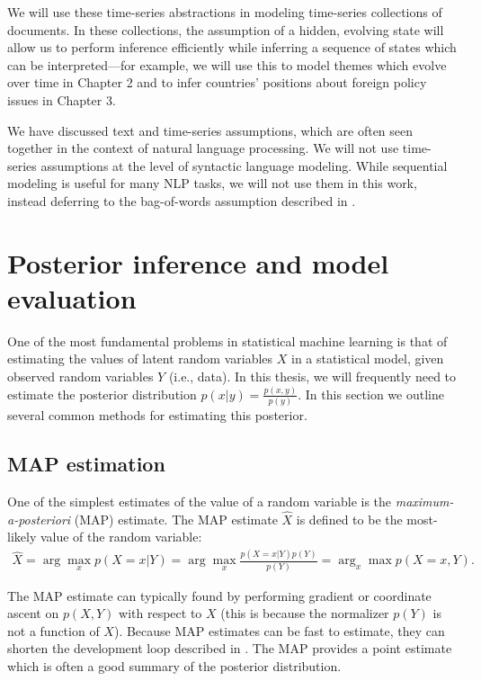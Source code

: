 We will use these time-series abstractions in modeling time-series
collections of documents.  In these collections, the assumption of a
hidden, evolving state will allow us to perform inference efficiently
while inferring a sequence of states which can be interpreted---for
example, we will use this to model themes which evolve over time in
Chapter 2 and to infer countries' positions about foreign policy
issues in Chapter 3.

We have discussed text and time-series assumptions, which are often
seen together in the context of natural language processing.  We will
not use time-series assumptions at the level of syntactic language
modeling.  While sequential modeling is useful for many NLP tasks, we
will not use them in this work, instead deferring to the bag-of-words
assumption described in .


\section{Posterior inference and model evaluation}
One of the most fundamental problems in statistical machine learning
is that of estimating the values of latent random variables $X$ in a
statistical model, given observed random variables $Y$ (i.e., data).
In this thesis, we will frequently need to estimate the posterior distribution
$p(x | y) = \frac{p(x, y)}{p(y)}$.  In this section we outline
several common methods for estimating this posterior.

\subsection{MAP estimation}
One of the simplest estimates of the value of a random variable is the \emph{maximum-a-posteriori} (MAP) estimate.  The MAP estimate $\hat X$ is defined to be the most-likely value of the random variable:
\begin{align}
  \hat X = \arg \max_x p(X=x | Y) = \arg \max_x \frac{p(X=x | Y) p(Y)}{p(Y)} = \arg_x \max p(X=x, Y).
\end{align}

The MAP estimate can typically found by performing gradient or
coordinate ascent on $p(X, Y)$ with respect to $X$ (this is because
the normalizer $p(Y)$ is not a function of $X$).  Because MAP
estimates can be fast to estimate, they can shorten the development
loop described in . The MAP provides a point estimate
which is often a good summary of the posterior distribution.

